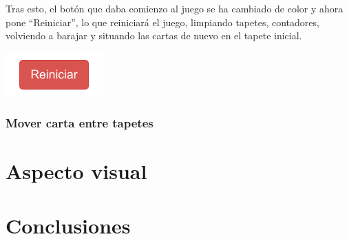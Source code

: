 \documentclass{\ClassPath/viu-tfm-template}
\begin{document}
Tras esto, el botón que daba comienzo al juego se ha cambiado de color y ahora pone “Reiniciar”, lo que reiniciará el juego, limpiando tapetes, contadores, volviendo a barajar y situando las cartas de nuevo en el tapete inicial.

\vspace{-1.6em}
\begin{center}
    \includegraphics[width=0.2\linewidth]{img/reiniciar.png}
\end{center}
\vspace{-1em}


\subsection{Mover carta entre tapetes}



\chapter{Aspecto visual}


\chapter{Conclusiones}


\end{document}
